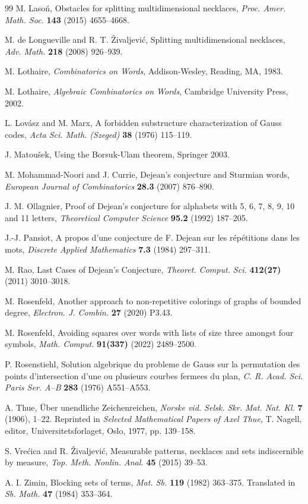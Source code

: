 \documentclass[12pt]{amsart}
\theoremstyle{plain}
\numberwithin{equation}{section}
\begin{document}
\begin{thebibliography}{99}
 M. Lasoń, Obstacles for splitting multidimensional necklaces, {\it Proc. Amer. Math. Soc.} {\bf 143} (2015) 4655--4668.

 M. de Longueville and R. T. \v{Z}ivaljevi\'c, Splitting multidimensional necklaces, {\it Adv. Math.} {\bf 218} (2008) 926--939.

 M. Lothaire, {\it Combinatorics on Words}, Addison-Wesley, Reading, MA, 1983.

 M. Lothaire, {\it Algebraic Combinatorics on Words}, Cambridge University Press, 2002.

 L. Lov\'{a}sz and M. Marx, A forbidden substructure characterization of Gauss codes, {\it Acta Sci. Math. (Szeged)} {\bf 38} (1976) 115--119.

 J. Matou\v{s}ek, Using the Borsuk-Ulam theorem, Springer 2003.

 M. Mohammad-Noori and J. Currie, Dejean's conjecture and Sturmian words, \emph{European Journal of Combinatorics} {\bf28.3} (2007) 876--890.

 J. M. Ollagnier, Proof of Dejean's conjecture for alphabets with 5, 6, 7, 8, 9, 10 and 11 letters, \emph{Theoretical Computer Science} {\bf95.2} (1992) 187--205.

 J.-J. Pansiot, A propos d'une conjecture de F. Dejean sur les r\'ep\'etitions dans les mots, \emph{Discrete Applied Mathematics} {\bf7.3} (1984) 297--311.

 M. Rao, Last Cases of Dejean's Conjecture, {\it Theoret. Comput. Sci.} {\bf 412(27)} (2011) 3010--3018.

 M. Rosenfeld, Another approach to non-repetitive colorings of graphs of bounded degree, {\it Electron. J. Combin.} {\bf 27} (2020) P3.43.

 M. Rosenfeld, Avoiding squares over words with lists of size three amongst four symbols, {\it Math. Comput.} {\bf91(337)} (2022) 2489--2500.

 P. Rosenstiehl, Solution algebrique du probleme de Gauss sur la permutation des points d’intersection d’une ou plusieurs courbes fermees du plan, {\it C. R. Acad. Sci. Paris Ser. A–B} {\bf 283} (1976) A551--A553.

 A. Thue, \"{U}ber unendliche Zeichenreichen, {\it Norske vid. Selsk. Skr. Mat. Nat. Kl.} {\bf 7} (1906), 1--22. Reprinted in {\it Selected Mathematical Papers of Axel Thue}, T. Nagell, editor, Universitetsforlaget, Oslo, 1977, pp. 139--158.

 S. Vre\'cica and R. \v{Z}ivaljevi\'c, Measurable patterns, necklaces and sets indiscernible by measure, {\it Top. Meth. Nonlin. Anal.} {\bf 45} (2015) 39--53.

 A. I. Zimin, Blocking sets of terms, \emph{Mat. Sb.} {\bf 119} (1982) 363--375. Translated in {\it Sb. Math.} {\bf 47} (1984) 353–364.

\end{thebibliography}
\end{document}
